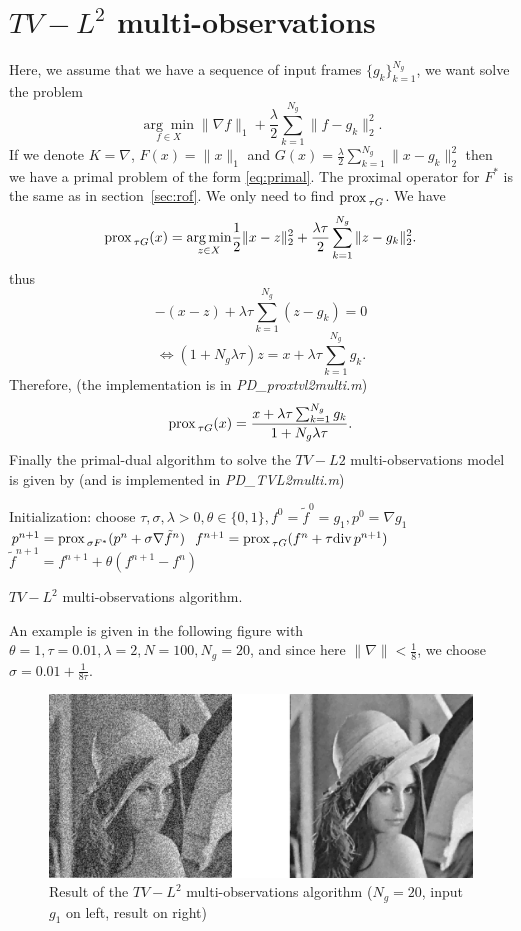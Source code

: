 \documentclass[letter,10pt]{article}
\def\Div{\textup{div\,}}
\def\prox{\textup{prox\,}}
\begin{document}
\section{$TV-L^2$ multi-observations}
Here, we assume that we have a sequence of input frames $\{g_k\}_{k=1}^{N_g}$, we want solve the problem
$$\underset{f\in X}{\arg\min}\|\nabla f\|_1+\frac{\lambda}{2}\sum_{k=1}^{N_g}\|f-g_k\|_2^2.$$
If we denote $K=\nabla$, $F(x)=\|x\|_1$ and $G(x)=\frac{\lambda}{2}\sum_{k=1}^{N_g}\|x-g_k\|_2^2$ then we have a primal problem of the form \eqref{eq:primal}. The proximal 
operator 
for $F^*$ is the same as in section~\ref{sec:rof}. We only need 
to find $\prox_{\tau G}$. We have
$$\prox_{\tau G}(x)=\underset{z\in X}{\arg\min}\frac{1}{2}\|x-z\|_2^2+\frac{\lambda\tau}{2}\sum_{k=1}^{N_g}\|z-g_k\|_2^2.$$
thus
$$-(x-z)+\lambda\tau\sum_{k=1}^{N_g}(z-g_k)=0$$
$$\Leftrightarrow (1+N_g\lambda\tau)z=x+\lambda\tau\sum_{k=1}^{N_g}g_k.$$
Therefore, (the implementation is in \textit{PD\_proxtvl2multi.m})
$$\prox_{\tau G}(x)=\frac{x+\lambda\tau\sum_{k=1}^{N_g}g_k}{1+N_g\lambda\tau}.$$
Finally the primal-dual algorithm to solve the $TV-L2$ multi-observations model is given by (and is implemented in \textit{PD\_TVL2multi.m})
\begin{algorithm}[H]
\begin{algorithmic}
\STATE Initialization: choose $\tau,\sigma,\lambda>0,\theta\in\{0,1\},f^0=\tilde{f}^0=g_1,p^0=\nabla g_1$
\REPEAT 
\STATE $p^{n+1}=\prox_{\sigma F^*}(p^n+\sigma \nabla\tilde{f}^n)$
\STATE $f^{n+1}=\prox_{\tau G}(f^n+\tau \Div p^{n+1})$
\STATE $\tilde{f}^{n+1}=f^{n+1}+\theta(f^{n+1}-f^n)$
\end{algorithmic}
\caption{$TV-L^2$ multi-observations algorithm.}
\end{algorithm}
An example is given in the following figure with $\theta=1,\tau=0.01,\lambda=2,N=100,N_g=20$, and since here $\|\nabla\|<\frac{1}{8}$, we choose $\sigma=0.01+\frac{1}{8\tau}$.
\begin{figure}[H]
\centering\includegraphics[width=\textwidth]{tvl2multi.png}
\caption{Result of the $TV-L^2$ multi-observations algorithm ($N_g=20$, input $g_1$ on left, result on right)}
\end{figure}
\end{document}

